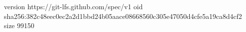 version https://git-lfs.github.com/spec/v1
oid sha256:382c48eec0ec2a2d1bbd24b05aace08668560c305e47050d4cfe5a19ca8d4cf2
size 99150
